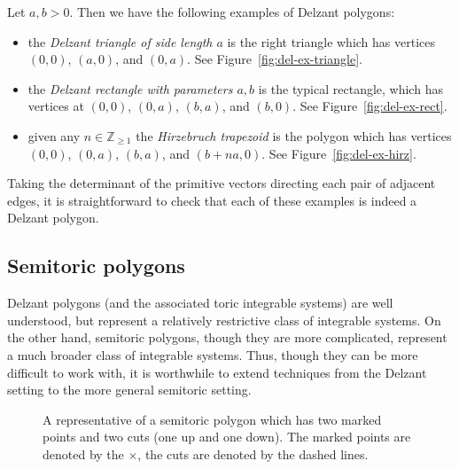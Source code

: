 \documentclass[10pt,a4paper]{amsart}
\numberwithin{equation}{section}
\def\Z{{\mathbb Z}}
\theoremstyle{definition}
\theoremstyle{plain}
\theoremstyle{plain}
\begin{document}
\begin{Definition}\label{def:delz-examples}
 Let $a,b>0$. Then we have the following examples of Delzant polygons:
\begin{itemize}\itemsep=0pt
\item the \emph{Delzant triangle of side length $a$} is the right triangle which has vertices $(0,0)$, $(a,0)$, and $(0,a)$. See Figure~\ref{fig:del-ex-triangle}.

\item the \emph{Delzant rectangle with parameters $a,b$} is the typical rectangle, which has vertices at $(0,0)$, $(0,a)$, $(b,a)$, and $(b,0)$. See Figure~\ref{fig:del-ex-rect}.

\item given any $n\in \Z_{\geq 1}$ the \emph{Hirzebruch trapezoid} is the polygon which has vertices $(0,0)$, $(0,a)$, $(b,a)$,
and $(b+na,0)$. See Figure~\ref{fig:del-ex-hirz}.
\end{itemize}
\end{Definition}

Taking the determinant of the primitive vectors directing each pair of adjacent edges, it is straightforward to check that each of these examples is indeed a Delzant polygon.




\subsection{Semitoric polygons}
\label{sec:semitoric-poly}

Delzant polygons (and the associated toric integrable systems) are well understood, but represent a relatively restrictive class of integrable systems.
On the other hand, semitoric polygons, though they are more complicated, represent a much broader class of integrable systems.
Thus, though they can be more difficult to work with, it is worthwhile to extend techniques from the Delzant setting to the more general semitoric setting.



\begin{figure}
 \centering
 \caption{A representative of a semitoric polygon which has two marked points and two cuts (one up and one down). The marked points are denoted by the $\times$, the cuts are denoted by the dashed lines.}
 \label{fig:representative}
\end{figure}
\end{document}
